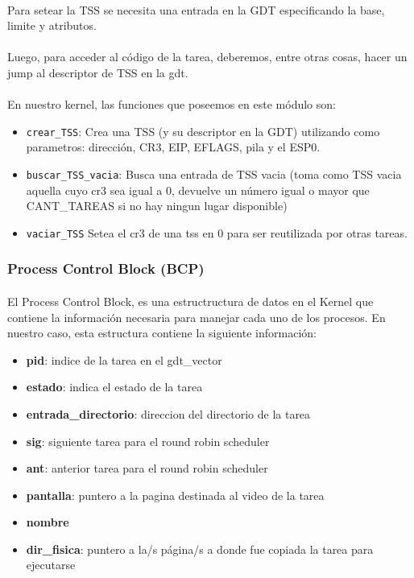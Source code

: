 \documentclass[11pt, a4paper]{article}
\begin{document}
	\paragraph{}
	Para setear la TSS se necesita una entrada en la GDT especificando la base, limite y atributos.

	\paragraph{}
	Luego, para acceder al c\'odigo de la tarea, deberemos, entre otras cosas, hacer un jump al descriptor de TSS en la gdt.

	\paragraph{}
	En nuestro kernel, las funciones que poseemos en este módulo son:
	\begin{itemize}
		\item \texttt{crear\_TSS}: Crea una TSS (y su descriptor en la GDT) utilizando como parametros: dirección, CR3, EIP, EFLAGS, pila y el ESP0.
		\item \texttt{buscar\_TSS\_vacia}: Busca una entrada de TSS vacia (toma como TSS vacia aquella cuyo cr3 sea igual a 0, devuelve un número igual o mayor que CANT\_TAREAS si no hay ningun lugar disponible)
		\item \texttt{vaciar\_TSS} Setea el cr3 de una tss en 0 para ser reutilizada por otras tareas.
	\end{itemize}

\subsubsection{Process Control Block (BCP) }
	\paragraph{}
	El Process Control Block, es una estructructura de datos en el Kernel que contiene la información necesaria para manejar cada uno de los procesos.
	En nuestro caso, esta estructura contiene la siguiente información:
	\begin{itemize}
		\item \textbf{pid}: indice de la tarea en el gdt\_vector
		\item \textbf{estado}: indica el estado de la tarea
		\item \textbf{entrada\_directorio}: direccion del directorio de la tarea
		\item \textbf{sig}: siguiente tarea para el round robin scheduler
		\item \textbf{ant}: anterior tarea para el round robin scheduler
		\item \textbf{pantalla}: puntero a la pagina destinada al video de la tarea
		\item \textbf{nombre}
		\item \textbf{dir\_fisica}: puntero a la/s página/s a donde fue copiada la tarea para ejecutarse
	\end{itemize}
\end{document}
